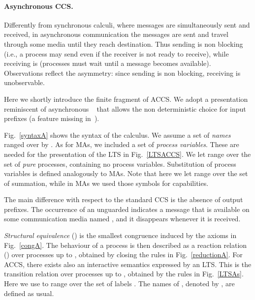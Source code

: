\documentclass[copyright,creativecommons]{eptcs}
\newcommand{\<}{\langle}
\renewcommand{\>}{\rangle}
\begin{document}
\paragraph{Asynchronous CCS.}
Differently from synchronous calculi, where messages are
simultaneously sent and received, in asynchronous communication the
messages are sent and travel through some media until they reach
destination. Thus sending is non blocking (i.e., a process may send
even if the receiver is not ready to receive), while receiving is
(processes must wait until a message becomes available).
Observations reflect the asymmetry: since sending is non blocking,
receiving is unobservable.

Here we shortly introduce the finite fragment of ACCS.
We adopt a presentation reminiscent of
asynchronous ~\cite{AmadioCS98} that allows the non
deterministic choice for input prefixes (a feature missing
in~\cite{BorealeNP98,CastellaniH98}).



Fig.~\ref{syntaxA} shows the syntax of the calculus. We assume a set
 of \emph{names} ranged over by .
As for MAs, we included a set  of \emph{process
  variables}. These are needed for the presentation of the LTS in
Fig.~\ref{LTSACCS}.
We let  range over the set of \emph{pure} processes,
containing no process variables. Substitution of process variables is
defined analogously to MAs. Note that here we let 
range over the set of summation, while in MAs we used
those symbols for capabilities.

The main difference with respect to the standard CCS \cite{MIL:CAC} is the absence of
output prefixes. The occurrence of an unguarded  indicates
a message that is available on some communication media named ,
and it disappears whenever it is received.

\emph{Structural equivalence} () is the smallest congruence
induced by the axioms in Fig.~\ref{congA}.
The behaviour of a process  is then described as a reaction
relation () over processes up to , obtained by
closing the rules in Fig.~\ref{reductionA}.
For ACCS, there exists also an interactive semantics
expressed by an LTS. This is the transition relation over processes
up to , obtained by the rules in Fig.~\ref{LTSAs}. Here we
use  to range over the set of labels . The names of , denoted by , are
defined as usual.
\end{document}
